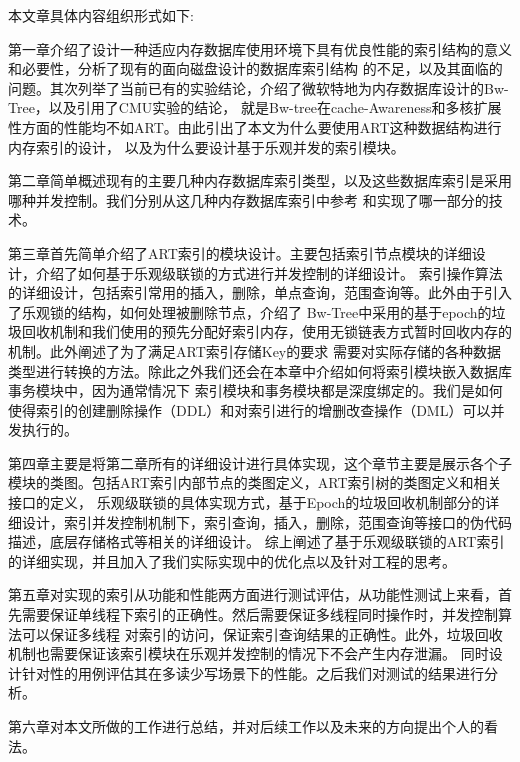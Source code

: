 本文章具体内容组织形式如下:

第一章介绍了设计一种适应内存数据库使用环境下具有优良性能的索引结构的意义和必要性，分析了现有的面向磁盘设计的数据库索引结构
的不足，以及其面临的问题。其次列举了当前已有的实验结论，介绍了微软特地为内存数据库设计的Bw-Tree，以及引用了CMU实验的结论，
就是Bw-tree在cache-Awareness和多核扩展性方面的性能均不如ART。由此引出了本文为什么要使用ART这种数据结构进行内存索引的设计，
以及为什么要设计基于乐观并发的索引模块。

第二章简单概述现有的主要几种内存数据库索引类型，以及这些数据库索引是采用哪种并发控制。我们分别从这几种内存数据库索引中参考
和实现了哪一部分的技术。

第三章首先简单介绍了ART索引的模块设计。主要包括索引节点模块的详细设计，介绍了如何基于乐观级联锁的方式进行并发控制的详细设计。
索引操作算法的详细设计，包括索引常用的插入，删除，单点查询，范围查询等。此外由于引入了乐观锁的结构，如何处理被删除节点，介绍了
Bw-Tree中采用的基于epoch的垃圾回收机制和我们使用的预先分配好索引内存，使用无锁链表方式暂时回收内存的机制。此外阐述了为了满足ART索引存储Key的要求
需要对实际存储的各种数据类型进行转换的方法。除此之外我们还会在本章中介绍如何将索引模块嵌入数据库事务模块中，因为通常情况下
索引模块和事务模块都是深度绑定的。我们是如何使得索引的创建删除操作（DDL）和对索引进行的增删改查操作（DML）可以并发执行的。

第四章主要是将第二章所有的详细设计进行具体实现，这个章节主要是展示各个子模块的类图。包括ART索引内部节点的类图定义，ART索引树的类图定义和相关接口的定义，
乐观级联锁的具体实现方式，基于Epoch的垃圾回收机制部分的详细设计，索引并发控制机制下，索引查询，插入，删除，范围查询等接口的伪代码描述，底层存储格式等相关的详细设计。
综上阐述了基于乐观级联锁的ART索引的详细实现，并且加入了我们实际实现中的优化点以及针对工程的思考。

第五章对实现的索引从功能和性能两方面进行测试评估，从功能性测试上来看，首先需要保证单线程下索引的正确性。然后需要保证多线程同时操作时，并发控制算法可以保证多线程
对索引的访问，保证索引查询结果的正确性。此外，垃圾回收机制也需要保证该索引模块在乐观并发控制的情况下不会产生内存泄漏。
同时设计针对性的用例评估其在多读少写场景下的性能。之后我们对测试的结果进行分析。

第六章对本文所做的工作进行总结，并对后续工作以及未来的方向提出个人的看法。
